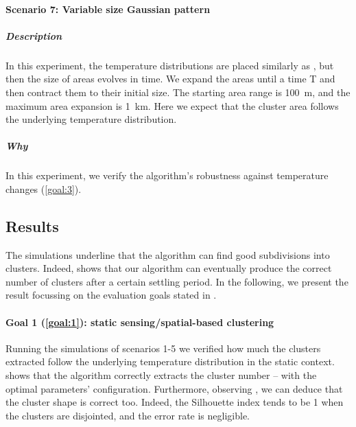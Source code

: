\paragraph{Scenario 7: Variable size Gaussian pattern}
\subparagraph{Description}
In this experiment, the temperature distributions are placed similarly as ,
 but then the size of areas evolves in time.
 We expand the areas until a time T and then contract them to their initial size.
 The starting area range is \SI{100}{\metre}, and the maximum area expansion is \SI{1}{\kilo\metre}.
 Here we expect that the cluster area follows the underlying temperature distribution.
\subparagraph{Why} In this experiment, we verify the algorithm's robustness against temperature changes (\ref{goal:3}).
\subsection{Results}\label{s:eval:results}




The simulations underline that the algorithm can find good subdivisions into clusters.
%
Indeed,  shows that our algorithm can eventually produce the correct number of clusters after a certain settling period.
%
In the following, we present the result focussing on the evaluation goals stated in .

\paragraph{Goal 1 (\ref{goal:1}): static sensing/spatial-based clustering}
Running the simulations of scenarios 1-5 we verified how much the clusters extracted follow the underlying temperature distribution in the static context.
  shows that the algorithm correctly extracts the cluster number -- with the optimal parameters' configuration.
 Furthermore, observing , we can deduce that the cluster shape is correct too.
 Indeed, the Silhouette index tends to be 1 when the clusters are disjointed, and the error rate is negligible.

